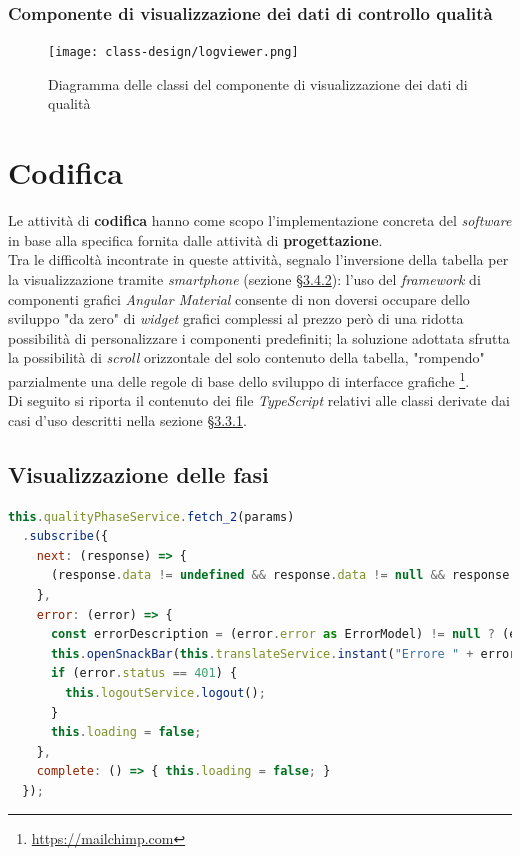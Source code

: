 \subsubsection*{Componente di visualizzazione dei dati di controllo qualità}
\begin{figure}[H]
    \centering
    \texttt{[image: class-design/logviewer.png]}
    \caption{Diagramma delle classi del componente di visualizzazione dei dati di qualità}
\end{figure}

\section{Codifica}
Le attività di \textbf{codifica} hanno come scopo l'implementazione concreta del \textit{software} in base alla specifica fornita dalle attività di \textbf{progettazione}. \\
Tra le difficoltà incontrate in queste attività, segnalo l'inversione della tabella per la visualizzazione tramite \textit{smartphone} (sezione \hyperref[subsubsec:mobile]{§3.4.2}): l'uso del \textit{framework} di componenti grafici \textit{Angular Material} consente di non doversi occupare
dello sviluppo "da zero" di \textit{widget} grafici complessi al prezzo però di una ridotta possibilità di personalizzare i componenti predefiniti; la soluzione adottata sfrutta la possibilità di \textit{scroll} orizzontale del solo contenuto della tabella,
"rompendo" parzialmente una delle regole di base dello sviluppo di interfacce grafiche \footnote{\href{https://mailchimp.com/resources/horizontal-scrolling/}{https://mailchimp.com}}. \\
Di seguito si riporta il contenuto dei file \textit{TypeScript} relativi alle classi derivate dai casi d'uso descritti nella sezione \hyperref[subsubsec:casi-d'uso]{§3.3.1}.

\newpage
\subsection*{Visualizzazione delle fasi}
\begin{lstlisting}[language=JavaScript, caption={Visualizzazione delle fasi}]
this.qualityPhaseService.fetch_2(params)
  .subscribe({
    next: (response) => {
      (response.data != undefined && response.data != null && response.data.length != 0) ? this.phases = response.data : this.openSnackBar(this.translateService.instant("Errore: non ci sono fasi da visualizzare!"), "X");
    },
    error: (error) => {
      const errorDescription = (error.error as ErrorModel) != null ? (error.error as ErrorModel).description : (error.status == 401 ? "Non autorizzato" : "Errore lato server");
      this.openSnackBar(this.translateService.instant("Errore " + error.status + " - " + errorDescription), "X");
      if (error.status == 401) {
        this.logoutService.logout();
      }
      this.loading = false;
    },
    complete: () => { this.loading = false; }
  });
\end{lstlisting}

